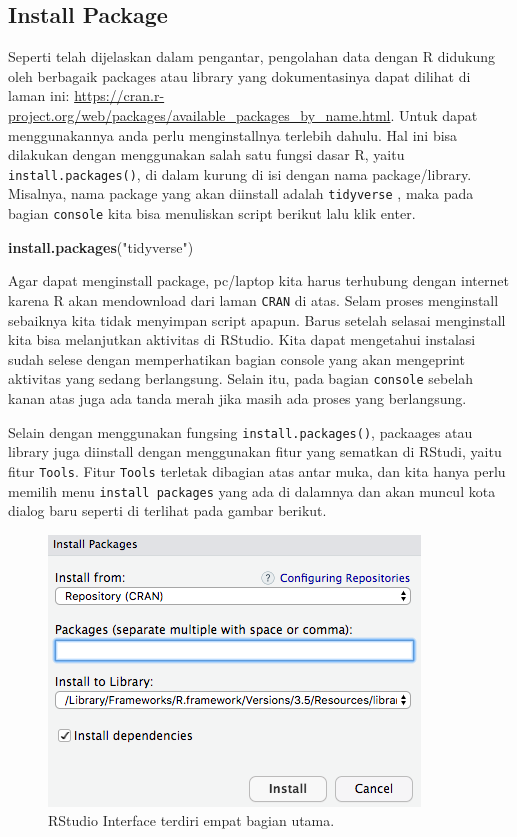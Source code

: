 \documentclass[]{book}
\newenvironment{Shaded}{\begin{snugshade}}{\end{snugshade}}
\newcommand{\KeywordTok}[1]{\textcolor[rgb]{0.13,0.29,0.53}{\textbf{#1}}}
\newcommand{\NormalTok}[1]{#1}
\newcommand{\StringTok}[1]{\textcolor[rgb]{0.31,0.60,0.02}{#1}}
\begin{document}
\hypertarget{install-package}{%
\subsection{Install Package}\label{install-package}}

Seperti telah dijelaskan dalam pengantar, pengolahan data dengan R
didukung oleh berbagaik packages atau library yang dokumentasinya dapat
dilihat di laman ini:
\url{https://cran.r-project.org/web/packages/available_packages_by_name.html}.
Untuk dapat menggunakannya anda perlu menginstallnya terlebih dahulu.
Hal ini bisa dilakukan dengan menggunakan salah satu fungsi dasar R,
yaitu \texttt{install.packages()}, di dalam kurung di isi dengan nama
package/library. Misalnya, nama package yang akan diinstall adalah
\texttt{tidyverse} \citep{R-tidyverse}, maka pada bagian
\texttt{console} kita bisa menuliskan script berikut lalu klik enter.

\begin{Shaded}
\begin{Highlighting}[]
\KeywordTok{install.packages}\NormalTok{(}\StringTok{"tidyverse"}\NormalTok{)}
\end{Highlighting}
\end{Shaded}

Agar dapat menginstall package, pc/laptop kita harus terhubung dengan
internet karena R akan mendownload dari laman \texttt{CRAN} di atas.
Selam proses menginstall sebaiknya kita tidak menyimpan script apapun.
Barus setelah selasai menginstall kita bisa melanjutkan aktivitas di
RStudio. Kita dapat mengetahui instalasi sudah selese dengan
memperhatikan bagian console yang akan mengeprint aktivitas yang sedang
berlangsung. Selain itu, pada bagian \texttt{console} sebelah kanan atas
juga ada tanda merah jika masih ada proses yang berlangsung.

Selain dengan menggunakan fungsing \texttt{install.packages()},
packaages atau library juga diinstall dengan menggunakan fitur yang
sematkan di RStudi, yaitu fitur \texttt{Tools}. Fitur \texttt{Tools}
terletak dibagian atas antar muka, dan kita hanya perlu memilih menu
\texttt{install\ packages} yang ada di dalamnya dan akan muncul kota
dialog baru seperti di terlihat pada gambar berikut.

\begin{figure}
\includegraphics[width=0.4\linewidth]{images/installpackage} \caption{RStudio Interface terdiri empat bagian utama.}\label{fig:intro5}
\end{figure}
\end{document}
